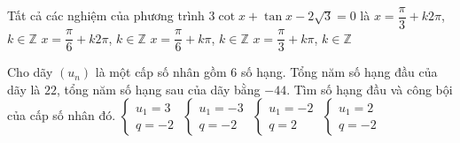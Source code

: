 \begin{ex}%
	Tất cả các nghiệm của phương trình $3\cot x +\tan x -2\sqrt{3} = 0$ là
	\choice
	{$x=\dfrac{\pi}{3}+k2\pi$, $k\in\mathbb{Z}$}
	{$x=\dfrac{\pi}{6}+k2\pi$, $k\in\mathbb{Z}$}
	{$x=\dfrac{\pi}{6}+k\pi$, $k\in\mathbb{Z}$}
	{\True $x=\dfrac{\pi}{3}+k\pi$, $k\in\mathbb{Z}$}
\end{ex}

\begin{ex}%
	Cho dãy $(u_n)$ là một cấp số nhân gồm $6$ số hạng. Tổng năm số hạng đầu của dãy là $22$, tổng năm số hạng sau của dãy bằng $-44$. Tìm số hạng đầu và công bội của cấp số nhân đó.
	\choice
	{$\begin{cases} u_1 = 3\\ q = -2 \end{cases}$}
	{$\begin{cases} u_1 = -3\\ q = -2 \end{cases}$}
	{$\begin{cases} u_1 = -2\\ q = 2 \end{cases}$}
	{\True $\begin{cases} u_1 = 2\\ q = -2 \end{cases}$}
\end{ex}

